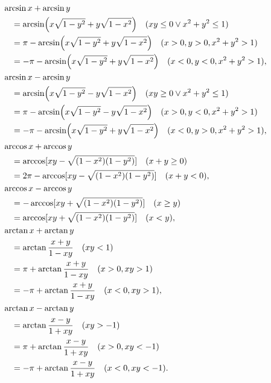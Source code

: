 \begin{theorem}[和差公式]
\begin{align}
	&\hspace{-10pt}
	\arcsin x + \arcsin y \notag \\
		&= \arcsin(x \sqrt{1-y^2} + y \sqrt{1-x^2})
			\quad(xy\leq0 \lor x^2+y^2\leq1) \\
		&= \pi - \arcsin(x \sqrt{1-y^2} + y \sqrt{1-x^2})
			\quad(x>0, y>0, x^2+y^2>1) \\
		&= -\pi - \arcsin(x \sqrt{1-y^2} + y \sqrt{1-x^2})
			\quad(x<0, y<0, x^2+y^2>1), \\
	&\hspace{-10pt}
	\arcsin x - \arcsin y \notag \\
		&= \arcsin(x \sqrt{1-y^2} - y \sqrt{1-x^2})
			\quad(xy\geq0 \lor x^2+y^2\leq1) \\
		&= \pi - \arcsin(x \sqrt{1-y^2} - y \sqrt{1-x^2})
			\quad(x>0, y<0, x^2+y^2>1) \\
		&= -\pi - \arcsin(x \sqrt{1-y^2} + y \sqrt{1-x^2})
			\quad(x<0, y>0, x^2+y^2>1), \\
	&\hspace{-10pt}
	\arccos x + \arccos y \notag \\
		&= \arccos[xy - \sqrt{(1-x^2)(1-y^2)}]
			\quad(x+y\geq0) \\
		&= 2\pi - \arccos[xy - \sqrt{(1-x^2)(1-y^2)}]
			\quad(x+y<0), \\
	&\hspace{-10pt}
	\arccos x - \arccos y \notag \\
		&= -\arccos[xy + \sqrt{(1-x^2)(1-y^2)}]
			\quad(x \geq y) \\
		&= \arccos[xy + \sqrt{(1-x^2)(1-y^2)}]
			\quad(x<y), \\
	&\hspace{-10pt}
	\arctan x + \arctan y \notag \\
		&= \arctan\frac{x+y}{1-xy}
			\quad(xy<1) \\
		&= \pi+\arctan\frac{x+y}{1-xy}
			\quad(x>0,xy>1) \\
		&= -\pi+\arctan\frac{x+y}{1-xy}
			\quad(x<0,xy>1), \\
	&\hspace{-10pt}
	\arctan x - \arctan y \notag \\
		&= \arctan\frac{x-y}{1+xy}
			\quad(xy>-1) \\
		&= \pi+\arctan\frac{x-y}{1+xy}
			\quad(x>0,xy<-1) \\
		&= -\pi+\arctan\frac{x-y}{1+xy}
			\quad(x<0,xy<-1).
\end{align}
\end{theorem}

